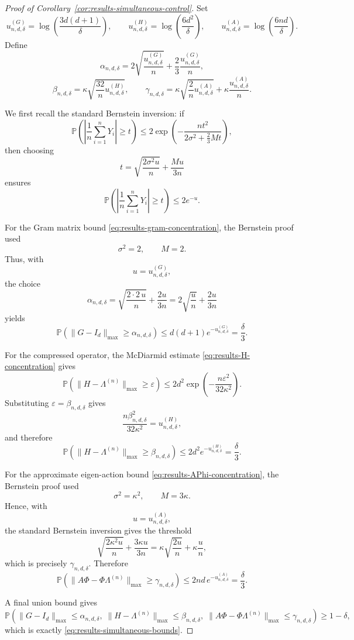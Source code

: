 \begin{proof}[Proof of Corollary~\ref{cor:results-simultaneous-control}]
	Set
	\[
		u_{n,d,\delta}^{(G)}
		=
		\log\!\left(\frac{3d(d+1)}{\delta}\right),
		\qquad
		u_{n,d,\delta}^{(H)}
		=
		\log\!\left(\frac{6d^2}{\delta}\right),
		\qquad
		u_{n,d,\delta}^{(A)}
		=
		\log\!\left(\frac{6nd}{\delta}\right).
	\]
	Define
	\[
		\alpha_{n,d,\delta}
		=
		2\sqrt{\frac{u_{n,d,\delta}^{(G)}}{n}}
		+
		\frac{2}{3}\frac{u_{n,d,\delta}^{(G)}}{n},
	\]
	\[
		\beta_{n,d,\delta}
		=
		\kappa\sqrt{\frac{32}{n}u_{n,d,\delta}^{(H)}},
		\qquad
		\gamma_{n,d,\delta}
		=
		\kappa\sqrt{\frac{2}{n}u_{n,d,\delta}^{(A)}}
		+
		\kappa\frac{u_{n,d,\delta}^{(A)}}{n}.
	\]

	We first recall the standard Bernstein inversion: if
	\[
		\mathbb P\!\left(\left|\frac{1}{n}\sum_{i=1}^n Y_i\right|\ge t\right)
		\le
		2\exp\!\left(
		-\frac{nt^2}{2\sigma^2+\frac{2}{3}Mt}
		\right),
	\]
	then choosing
	\[
		t=\sqrt{\frac{2\sigma^2 u}{n}}+\frac{Mu}{3n}
	\]
	ensures
	\[
		\mathbb P\!\left(\left|\frac{1}{n}\sum_{i=1}^n Y_i\right|\ge t\right)\le 2e^{-u}.
	\]

	For the Gram matrix bound \eqref{eq:results-gram-concentration}, the Bernstein proof used
	\[
		\sigma^2=2,
		\qquad
		M=2.
	\]
	Thus, with
	\[
		u=u_{n,d,\delta}^{(G)},
	\]
	the choice
	\[
		\alpha_{n,d,\delta}
		=
		\sqrt{\frac{2\cdot 2\,u}{n}}+\frac{2u}{3n}
		=
		2\sqrt{\frac{u}{n}}+\frac{2u}{3n}
	\]
	yields
	\[
		\mathbb P\!\left(\|G-I_d\|_{\max}\ge \alpha_{n,d,\delta}\right)
		\le
		d(d+1)e^{-u_{n,d,\delta}^{(G)}}
		=
		\frac{\delta}{3}.
	\]

	For the compressed operator, the McDiarmid estimate \eqref{eq:results-H-concentration} gives
	\[
		\mathbb P\!\left(\|H-\Lambda^{(n)}\|_{\max}\ge \varepsilon\right)
		\le
		2d^2\exp\!\left(-\frac{n\varepsilon^2}{32\kappa^2}\right).
	\]
	Substituting \(\varepsilon=\beta_{n,d,\delta}\) gives
	\[
		\frac{n\beta_{n,d,\delta}^2}{32\kappa^2}
		=
		u_{n,d,\delta}^{(H)},
	\]
	and therefore
	\[
		\mathbb P\!\left(\|H-\Lambda^{(n)}\|_{\max}\ge \beta_{n,d,\delta}\right)
		\le
		2d^2e^{-u_{n,d,\delta}^{(H)}}
		=
		\frac{\delta}{3}.
	\]

	For the approximate eigen-action bound \eqref{eq:results-APhi-concentration}, the Bernstein proof
	used
	\[
		\sigma^2=\kappa^2,
		\qquad
		M=3\kappa.
	\]
	Hence, with
	\[
		u=u_{n,d,\delta}^{(A)},
	\]
	the standard Bernstein inversion gives the threshold
	\[
		\sqrt{\frac{2\kappa^2 u}{n}}+\frac{3\kappa u}{3n}
		=
		\kappa\sqrt{\frac{2u}{n}}+\kappa\frac{u}{n},
	\]
	which is precisely \(\gamma_{n,d,\delta}\). Therefore
	\[
		\mathbb P\!\left(\|A\Phi-\Phi\Lambda^{(n)}\|_{\max}\ge \gamma_{n,d,\delta}\right)
		\le
		2nd\,e^{-u_{n,d,\delta}^{(A)}}
		=
		\frac{\delta}{3}.
	\]

	A final union bound gives
	\[
		\mathbb P\!\left(
		\|G-I_d\|_{\max}\le \alpha_{n,d,\delta},\;
		\|H-\Lambda^{(n)}\|_{\max}\le \beta_{n,d,\delta},\;
		\|A\Phi-\Phi\Lambda^{(n)}\|_{\max}\le \gamma_{n,d,\delta}
		\right)
		\ge
		1-\delta,
	\]
	which is exactly \eqref{eq:results-simultaneous-bounds}.
\end{proof}

